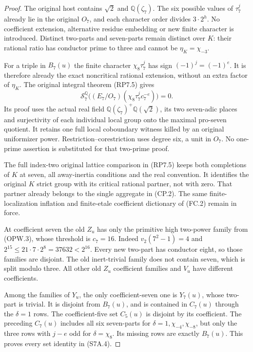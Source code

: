 \begin{proof}
The original host contains $\sqrt2$ and $\mathbb Q(\zeta_7)$.
The six possible values of $\tau_7^j$ already lie in the original
$O_7$, and each character order divides $3\cdot2^h$.
No coefficient extension, alternative residue embedding or new
finite character is introduced. Distinct two-parts and seven-parts
remain distinct over $K$: their rational ratio has conductor
prime to three and cannot be $\eta_K=\chi_{-3}$.

For a triple in $B_7(u)$ the finite character
$\chi_8\tau_7^j$ has sign $(-1)^j=(-1)^e$.
It is therefore already the exact noncritical rational extension,
without an extra factor of $\eta_K$.
The original integral theorem (RP7.5) gives
\[
       \mathcal S^{\mathbb Q}_7\bigl((E_7/O_7)
                       (\chi_8\tau_7^j c_7^{-e})\bigr)=0.
 \tag{S7A.8}
\]
Its proof uses the actual real field
$\mathbb Q(\zeta_7)^+\mathbb Q(\sqrt2)$, its two seven-adic
places and surjectivity of each individual local group onto the
maximal pro-seven quotient. It retains one full local coboundary
witness killed by an original uniformizer power.
Restriction--corestriction uses degree six, a unit in $O_7$.
No one-prime assertion is substituted for that two-prime proof.

The full index-two original lattice comparison in (RP7.5)
keeps both completions of $K$ at seven, all away-inertia
conditions and the real convention. It identifies the original
$K$ strict group with its critical rational partner, not with zero.
That partner already belongs to the single aggregate in (CP.2).
The same finite-localization inflation and finite-etale coefficient
dictionary of (FC.2) remain in force.

At coefficient seven the old $Z_u$ has only the primitive high
two-power family from (OPW.3), whose threshold is $c_7=16$.
Indeed $v_2(7^2-1)=4$ and
$2^{15}\leq21\cdot7\cdot2^8=37632<2^{16}$.
Every new two-part has conductor eight, so those families
are disjoint. The old inert-trivial family does not contain
seven, which is split modulo three. All other old $Z_u$
coefficient families and $V_u$ have different coefficients.

Among the families of $Y_u$, the only coefficient-seven one
is $Y_7(u)$, whose two-part is trivial. It is disjoint from
$B_7(u)$, and is contained in $C_7(u)$ through the $\delta=1$
rows. The coefficient-five set $C_5(u)$ is disjoint by its
coefficient. The preceding $C_7(u)$ includes all six seven-parts
for $\delta=1,\chi_{-4},\chi_{-8}$, but only the three rows
with $j-e$ odd for $\delta=\chi_8$. Its missing rows are exactly
$B_7(u)$. This proves every set identity in (S7A.4).


\end{proof}
